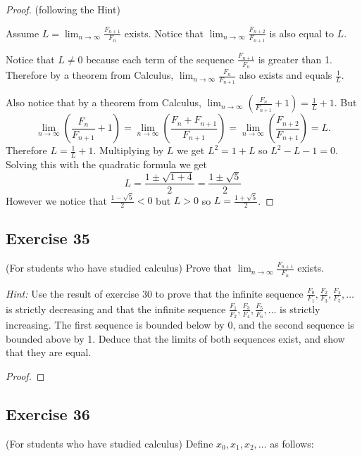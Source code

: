 \documentclass[14pt]{extarticle}
\newcommand{\dps}{\displaystyle}
\begin{document}
\begin{proof}
    (following the Hint)

    Assume \(\dps L = \lim_{n \to \infty} \frac{F_{n+1}}{F_n}\) exists. Notice that \(\dps \lim_{n \to \infty}
    \frac{F_{n+2}} {F_{n+1}}\) is also equal to $L$.

    Notice that \(L \neq 0\) because each term of the sequence \(\dps \frac{F_{n+1}}{F_n}\) is greater than 1. Therefore
    by a theorem from Calculus, \(\dps \lim_{n \to \infty} \frac{F_{n}}{F_{n+1}}\) also exists and equals \(\dps \frac{1}{L}\).

    Also notice that by a theorem from Calculus, \(\dps \lim_{n \to \infty} \left(\frac{F_n}{F_{n+1}} + 1\right) = \frac{1}{L} + 1.\) But
    \[
        \lim_{n \to \infty} \left(\frac{F_n}{F_{n+1}} + 1\right) = \lim_{n \to \infty} \left(\frac{F_n + F_{n+1}}{F_{n+1}}
        \right) =
        \lim_{n \to \infty} \left(\frac{F_{n+2}}{F_{n+1}}\right) = L.
    \]
    Therefore \(\dps L = \frac{1}{L} + 1.\) Multiplying by $L$ we get \(L^2 = 1 + L\) so \(L^2 - L - 1 = 0\). Solving this
    with the quadratic formula we get
    \[
        L = \frac{1 \pm \sqrt{1 + 4}}{2} = \frac{1 \pm \sqrt{5}}{2}
    \]
    However we notice that \(\dps \frac{1 - \sqrt{5}}{2} < 0\) but \(L > 0\) so \(\dps L = \frac{1 + \sqrt{5}}{2}\).
\end{proof}

\subsection{Exercise 35}
(For students who have studied calculus) Prove that \(\dps \lim_{n \to \infty} \frac{F_{n+1}}{F_n}\) exists.

    {\it Hint:} Use the result of exercise 30 to prove that the
infinite sequence \(\dps \frac{F_0}{F_1}, \frac{F_2}{F_3},
\frac{F_4}{F_5}, \ldots\) is strictly decreasing and that the infinite sequence \(\dps \frac{F_1}{F_2}, \frac{F_3}
{F_4}, \frac{F_5}{F_6}, \ldots\) is strictly increasing. The first sequence is bounded below by 0, and the second
sequence is bounded above by 1. Deduce that the limits of both sequences exist, and show that they are equal.

\begin{proof}

\end{proof}

\subsection{Exercise 36}
(For students who have studied calculus) Define $x_0, x_1, x_2, \ldots$ as follows:
\end{document}

